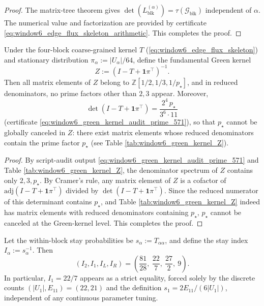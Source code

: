 \begin{proof}
The matrix-tree theorem gives \(\det(L_{\mathrm{blk}}^{(\alpha)})=\tau(\mathcal{G}_{\mathrm{blk}})\) independent of \(\alpha\).
The numerical value and factorization are provided by certificate \eqref{eq:window6_edge_flux_skeleton_arithmetic}. This completes the proof.
\end{proof}

\begin{proposition}\label{prop:xi-window6-green-kernel-arithmetic-audit-prime}
Under the four-block coarse-grained kernel \(T\) (\eqref{eq:window6_edge_flux_skeleton}) and stationary distribution
\(
\pi_\alpha:=|U_\alpha|/64
\),
define the fundamental Green kernel
\[
Z:=(I-T+\mathbf 1\pi^\top)^{-1}.
\]
Then all matrix elements of \(Z\) belong to \(\mathbb{Z}[1/2,1/3,1/p_\star]\), and in reduced denominators, no prime factors other than \(2,3\) appear.
Moreover,
\[
\det(I-T+\mathbf 1\pi^\top)=\frac{2^{4}\,p_\star}{3^{6}\cdot 11}
\]
(certificate \eqref{eq:window6_green_kernel_audit_prime_571}), so that \(p_\star\) cannot be globally canceled in \(Z\): there exist matrix elements whose reduced denominators contain the prime factor \(p_\star\) (see Table \ref{tab:window6_green_kernel_Z}).
\end{proposition}

\begin{proof}
By script-audit output \eqref{eq:window6_green_kernel_audit_prime_571} and Table \ref{tab:window6_green_kernel_Z}, the denominator spectrum of \(Z\) contains only \(2,3,p_\star\).
By Cramer's rule, any matrix element of \(Z\) is a cofactor of \(\mathrm{adj}(I-T+\mathbf 1\pi^\top)\) divided by \(\det(I-T+\mathbf 1\pi^\top)\).
Since the reduced numerator of this determinant contains \(p_\star\), and Table \ref{tab:window6_green_kernel_Z} indeed has matrix elements with reduced denominators containing \(p_\star\), \(p_\star\) cannot be canceled at the Green-kernel level. This completes the proof.
\end{proof}



\begin{proposition}\label{prop:xi-window6-stay-indices-22-7}
Let the within-block stay probabilities be \(s_\alpha:=T_{\alpha\alpha}\), and define the stay index \(I_\alpha:=s_\alpha^{-1}\).
Then
\[
(I_2,I_1,I_L,I_R)=\left(\frac{81}{28},\ \frac{22}{7},\ \frac{27}{2},\ 9\right).
\]
In particular, \(I_1=22/7\) appears as a strict equality, forced solely by the discrete counts \((|U_1|,E_{11})=(22,21)\) and the definition \(s_1=2E_{11}/(6|U_1|)\), independent of any continuous parameter tuning.
\end{proposition}

